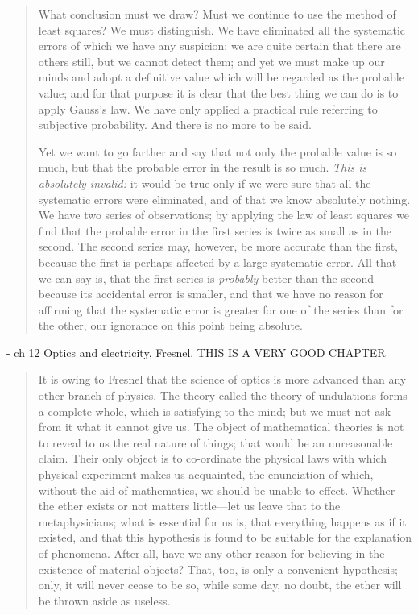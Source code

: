 \begin{quote}
     What conclusion must we draw?  Must we continue to use the method of least squares?  We must distinguish.  We have eliminated all the systematic errors of which we have any suspicion; we are quite certain that there are others still, but we cannot detect them; and yet we must make up our minds and adopt a definitive value which will be regarded as the probable value; and for that purpose it is clear that the best thing we can do is to apply Gauss's law.  We have only applied a practical rule referring to subjective probability.  And there is no more to be said.
     
     Yet we want to go farther and say that not only the probable value is so much, but that the probable error in the result is so much.  \emph{This is absolutely invalid:}  it would be true only if we were sure that all the systematic errors were eliminated, and of that we know absolutely nothing.  We have two series of observations; by applying the law of least squares we find that the probable error in the first series is twice as small as in the second.  The second series may, however, be more accurate than the first, because the first is perhaps affected by a large systematic error.  All that we can say is, that the first series is \emph{probably} better than the second because its accidental error is smaller, and that we have no reason for affirming that the systematic error is greater for one of the series than for the other, our ignorance on this point being absolute.
     
     \cite[p. 207-209]{Poincare1952}
 \end{quote}
 
 
 - ch 12 Optics and electricity, Fresnel.  THIS IS A VERY GOOD CHAPTER
 
\begin{quote}
    It is owing to Fresnel that the science of optics is more advanced than any other branch of physics.  The theory called the theory of undulations forms a complete whole, which is satisfying to the mind; but we must not ask from it what it cannot give us.  The object of mathematical theories is not to reveal to us the real nature of things; that would be an unreasonable claim.  Their only object is to co-ordinate the physical laws with which physical experiment makes us acquainted, the enunciation of which, without the aid of mathematics, we should be unable to effect.  Whether the ether exists or not matters little---let us leave that to the metaphysicians; what is essential for us is, that everything happens as if it existed, and that this hypothesis is found to be suitable for the explanation of phenomena.  After all, have we any other reason for believing in the existence of material objects?  That, too, is only a convenient hypothesis; only, it will never cease to be so, while some day, no doubt, the ether will be thrown aside as useless.
    
    \citep[p. 211-212]{Poincare1952}
\end{quote}

